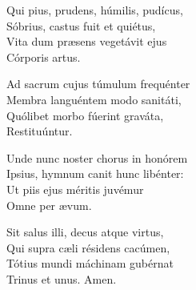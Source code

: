Qui pius, prudens, húmilis, pudícus,\\
Sóbrius, castus fuit et quiétus,\\
Vita dum præsens vegetávit ejus\\
Córporis artus.

Ad sacrum cujus túmulum frequénter\\
Membra languéntem modo sanitáti,\\
Quólibet morbo fúerint graváta,\\
Restituúntur.

Unde nunc noster chorus in honórem\\
Ipsius, hymnum canit hunc libénter:\\
Ut piis ejus méritis juvémur\\
Omne per ævum.

Sit salus illi, decus atque virtus,\\
Qui supra cæli résidens cacúmen,\\
Tótius mundi máchinam gubérnat\\
Trinus et unus.
Amen.